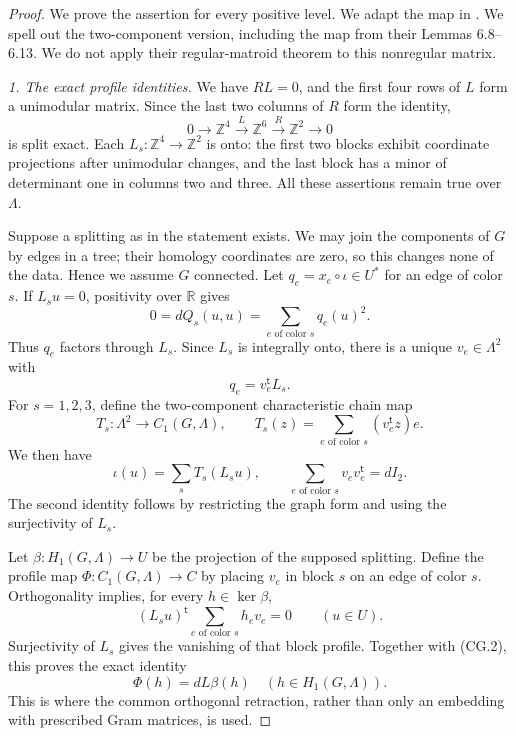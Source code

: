 \begin{proof}
We prove the assertion for every positive level. We adapt the map in
\citet[Proposition~6.14]{cyEngelFortmanSchreieder2026}.
We spell out the two-component version, including the map from their
Lemmas 6.8--6.13. We do not apply their regular-matroid theorem to
this nonregular matrix.

\emph{1. The exact profile identities.}
We have $RL=0$, and the first four rows of $L$ form a unimodular
matrix. Since the last two columns of $R$ form the identity,
\[
 0\longrightarrow\mathbb Z^4\xrightarrow{L}\mathbb Z^6
       \xrightarrow{R}\mathbb Z^2\longrightarrow0
 \tag{CG.1}
\]
is split exact. Each $L_s:\mathbb Z^4\to\mathbb Z^2$ is onto:
the first two blocks exhibit coordinate projections after unimodular
changes, and the last block has a minor of determinant one in
columns two and three. All these assertions remain true over
$\Lambda$.

Suppose a splitting as in the statement exists. We may join the
components of $G$ by edges in a tree; their homology coordinates
are zero, so this changes none of the data. Hence we assume $G$
connected. Let $q_e=x_e\circ\iota\in U^*$ for an edge of color $s$.
If $L_su=0$, positivity over $\mathbb R$ gives
\[
                 0=dQ_s(u,u)=\sum_{e\text{ of color }s}q_e(u)^2.
\]
Thus $q_e$ factors through $L_s$. Since $L_s$ is integrally onto,
there is a unique $v_e\in\Lambda^2$ with
\[
                 q_e=v_e^{\mathsf t}L_s.
\]
For $s=1,2,3$, define the two-component characteristic chain map
\[
 T_s:\Lambda^2\longrightarrow C_1(G,\Lambda),\qquad
 T_s(z)=\sum_{e\text{ of color }s}(v_e^{\mathsf t}z)e.
\]
We then have
\[
 \iota(u)=\sum_sT_s(L_su),\qquad
 \sum_{e\text{ of color }s}v_ev_e^{\mathsf t}=dI_2.
 \tag{CG.2}
\]
The second identity follows by restricting the graph form and using
the surjectivity of $L_s$.

Let $\beta:H_1(G,\Lambda)\to U$ be the projection of the supposed
splitting. Define the profile map $\Phi:C_1(G,\Lambda)\to C$ by
placing $v_e$ in block $s$ on an edge of color $s$. Orthogonality
implies, for every $h\in\ker\beta$,
\[
 (L_su)^{\mathsf t}\sum_{e\text{ of color }s}h_ev_e=0
                             \qquad(u\in U).
\]
Surjectivity of $L_s$ gives the vanishing of that block profile.
Together with (CG.2), this proves the exact identity
\[
                  \Phi(h)=dL\beta(h)
                            \quad(h\in H_1(G,\Lambda)).
 \tag{CG.3}
\]
This is where the common orthogonal retraction, rather than only
an embedding with prescribed Gram matrices, is used.


\end{proof}
